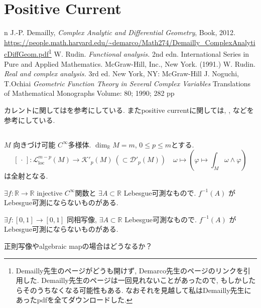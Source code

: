 \chapter{Positive Current}

\begin{thebibliography}{n}
J.-P. Demailly,
\textit{Complex Analytic and Differential Geometry},
Book, 2012.
\url{https://people.math.harvard.edu/~demarco/Math274/Demailly_ComplexAnalyticDiffGeom.pdf}\footnote{Demailly先生のページがどうも開けず, Demarco先生のページのリンクを引用した. Demailly先生のページは一回見れないことがあったので, もしかしたらそのうちなくなる可能性もある. なおそれを見越して私はDemailly先生にあったpdfを全てダウンロードした.}
W. Rudin. \textit{Functional analysis.} 2nd edn. International Series in Pure and Applied Mathematics. McGraw-Hill, Inc., New York. (1991.)
W. Rudin. \textit{Real and complex analysis. } 3rd ed. New York, NY: McGraw-Hill 
J. Noguchi, T.Ochiai \textit{Geometric Function Theory in Several Complex Variables} Translations of Mathematical Monographs
Volume: 80; 1990; 282 pp
\end{thebibliography}
 
カレントに関しては\cite[Chapter 3]{NO}を参考にしている. 
またpositive currentに関しては, 
\cite[Chapter 1. Section 3.C]{Dem}, \cite[Chapter 3. Section 1.]{Dem}
などを参考にしている. 


\section{}

\begin{tcolorbox}[mybox]
\begin{prop}
 \(M\) 向きづけ可能 \(C^\infty\)多様体. 
  \(\dim_{\mathbb R} M = m\),  \(0 \le p \le m\)とする. 
\[
[\,\cdot\,] : \mathcal{L}^{m-p}_{\mathrm{loc}}(M) \to \mathcal{K}'_p(M)\ (\subset \mathcal{D}'_p(M))
\quad
\omega \longmapsto \left(\varphi \mapsto \int_M \omega \wedge \varphi\right)
\]
は全射となる. 
\end{prop}
\end{tcolorbox}

\begin{rem}
 \(\exists f:\mathbb{R}\to\mathbb{R}\) injective \(C^\infty\)関数と \(\exists A \subset \mathbb{R}\) Lebesgue可測なもので. 
\(f^{-1}(A)\) がLebesgue可測にならないものがある.

\(\exists f:[0,1]\to[0,1]\) 同相写像, \(\exists A \subset \mathbb{R}\) Lebesgue可測なもので. 
\(f^{-1}(A)\) がLebesgue可測にならないものがある.
\end{rem}
\begin{ques}
正則写像やalgebraic mapの場合はどうなるか？
\end{ques}

